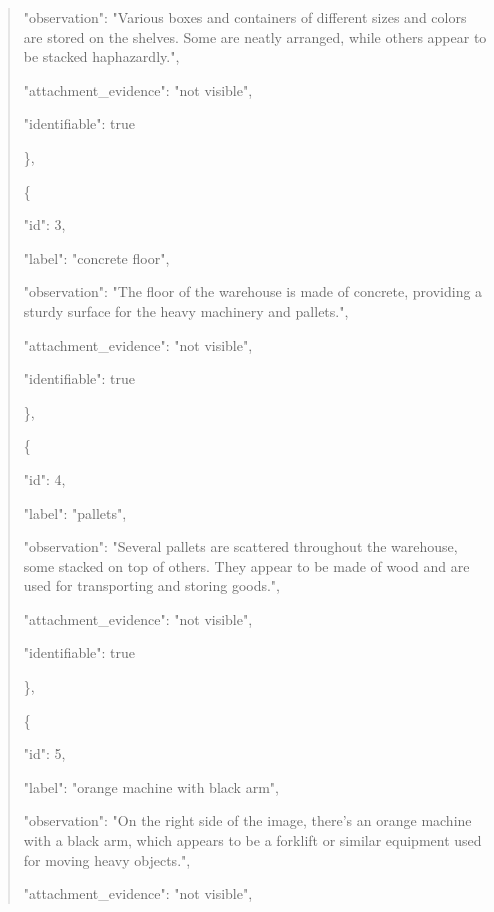 \documentclass[10pt,a4paper]{article}
\begin{document}
\begin{quote}
      "observation":\allowbreak{} "Various boxes and containers of different sizes and colors are stored on the shelves. Some are neatly arranged,\allowbreak{} while others appear to be stacked haphazardly.",\allowbreak{}\par
      "attachment\_evidence":\allowbreak{} "not visible",\allowbreak{}\par
      "identifiable":\allowbreak{} true\par
    \},\allowbreak{}\par
    \{\par
      "id":\allowbreak{} 3,\allowbreak{}\par
      "label":\allowbreak{} "concrete floor",\allowbreak{}\par
      "observation":\allowbreak{} "The floor of the warehouse is made of concrete,\allowbreak{} providing a sturdy surface for the heavy machinery and pallets.",\allowbreak{}\par
      "attachment\_evidence":\allowbreak{} "not visible",\allowbreak{}\par
      "identifiable":\allowbreak{} true\par
    \},\allowbreak{}\par
    \{\par
      "id":\allowbreak{} 4,\allowbreak{}\par
      "label":\allowbreak{} "pallets",\allowbreak{}\par
      "observation":\allowbreak{} "Several pallets are scattered throughout the warehouse,\allowbreak{} some stacked on top of others. They appear to be made of wood and are used for transporting and storing goods.",\allowbreak{}\par
      "attachment\_evidence":\allowbreak{} "not visible",\allowbreak{}\par
      "identifiable":\allowbreak{} true\par
    \},\allowbreak{}\par
    \{\par
      "id":\allowbreak{} 5,\allowbreak{}\par
      "label":\allowbreak{} "orange machine with black arm",\allowbreak{}\par
      "observation":\allowbreak{} "On the right side of the image,\allowbreak{} there's an orange machine with a black arm,\allowbreak{} which appears to be a forklift or similar equipment used for moving heavy objects.",\allowbreak{}\par
      "attachment\_evidence":\allowbreak{} "not visible",\allowbreak{}\par

\end{quote}
\end{document}
